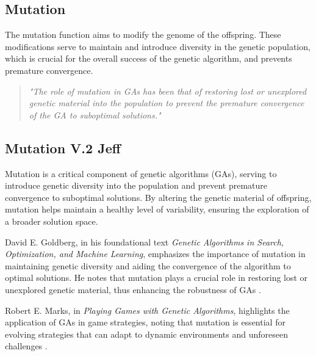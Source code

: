 \documentclass[a4paper, twocolumn]{article}
\begin{document}
\subsection{Mutation\label{sec:Mutation}}
 
The mutation function aims to modify the genome of the offspring. These modifications serve to maintain and introduce diversity in the genetic population, which is crucial for the overall success of the genetic algorithm, and prevents premature convergence.
\begin{quote}
\emph{
    "The role of mutation in GAs has been that of restoring lost or unexplored genetic material into the population to prevent the premature convergence of the GA to suboptimal solutions."
    }
    \cite{srinvas1994adaptive}
\end{quote}


\subsection{Mutation V.2 Jeff\label{sec:Mutation}}

Mutation is a critical component of genetic algorithms (GAs), serving to introduce genetic diversity into the population and prevent premature convergence to suboptimal solutions. By altering the genetic material of offspring, mutation helps maintain a healthy level of variability, ensuring the exploration of a broader solution space.

David E. Goldberg, in his foundational text \textit{Genetic Algorithms in Search, Optimization, and Machine Learning}, emphasizes the importance of mutation in maintaining genetic diversity and aiding the convergence of the algorithm to optimal solutions. He notes that mutation plays a crucial role in restoring lost or unexplored genetic material, thus enhancing the robustness of GAs \cite{goldberg1989genetic}.

Robert E. Marks, in \textit{Playing Games with Genetic Algorithms}, highlights the application of GAs in game strategies, noting that mutation is essential for evolving strategies that can adapt to dynamic environments and unforeseen challenges \cite{marks2001playing}.
\end{document}
